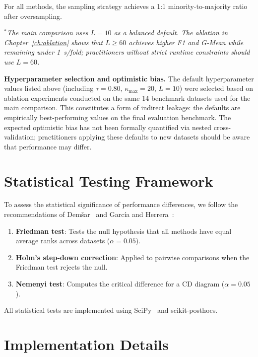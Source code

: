 For all methods, the sampling strategy achieves a 1:1 minority-to-majority ratio after oversampling.

\noindent$^*$\textit{The main comparison uses $L=10$ as a balanced default.
The ablation in Chapter~\ref{ch:ablation} shows that $L \geq 60$ achieves higher F1 and G-Mean while remaining under 1~s/fold; practitioners without strict runtime constraints should use $L=60$.}

\medskip
\noindent\textbf{Hyperparameter selection and optimistic bias.}
The default hyperparameter values listed above (including $\tau=0.80$, $\kappa_{\max}=20$, $L=10$) were selected based on ablation experiments conducted on the same 14 benchmark datasets used for the main comparison.
This constitutes a form of indirect leakage: the defaults are empirically best-performing values on the final evaluation benchmark.
The expected optimistic bias has not been formally quantified via nested cross-validation; practitioners applying these defaults to new datasets should be aware that performance may differ.


\section{Statistical Testing Framework}
\label{sec:setup:stats}

To assess the statistical significance of performance differences, we follow the recommendations of Dem\v{s}ar~\cite{demsar2006statistical} and Garc\'{i}a and Herrera~\cite{garcia2008extension}:

\begin{enumerate}[leftmargin=*]
    \item \textbf{Friedman test}: Tests the null hypothesis that all methods have equal average ranks across datasets ($\alpha = 0.05$).
    \item \textbf{Holm's step-down correction}: Applied to pairwise comparisons when the Friedman test rejects the null.
    \item \textbf{Nemenyi test}: Computes the critical difference for a CD diagram ($\alpha = 0.05$).
\end{enumerate}

All statistical tests are implemented using SciPy~\cite{pedregosa2011scikit} and scikit-posthocs.


\section{Implementation Details}
\label{sec:setup:implementation}

